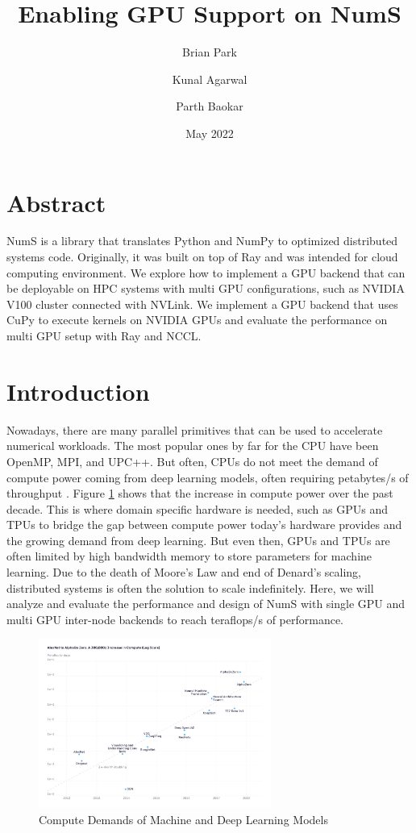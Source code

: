 \documentclass{article}
\title{Enabling GPU Support on NumS}
\author{Brian Park}
\author{Kunal Agarwal}
\author{Parth Baokar}
\affil{UC Berkeley, Computer Science 267}
\date{May 2022}
\begin{document}
\maketitle

\section*{Abstract}
NumS is a library that translates Python and NumPy to optimized distributed systems code. Originally, it was built on top of Ray and was intended for cloud computing environment. We explore how to implement a GPU backend that can be deployable on HPC systems with multi GPU configurations, such as NVIDIA V100 cluster connected with NVLink. We implement a GPU backend that uses CuPy to execute kernels on NVIDIA GPUs and evaluate the performance on multi GPU setup with Ray and NCCL.

\section{Introduction}
Nowadays, there are many parallel primitives that can be used to accelerate numerical workloads. The most popular ones by far for the CPU have been OpenMP, MPI, and UPC++. But often, CPUs do not meet the demand of compute power coming from deep learning models, often requiring petabytes/s of throughput \cite{openai}. Figure \ref{fig:openai} shows that the increase in compute power over the past decade. This is where domain specific hardware is needed, such as GPUs and TPUs to bridge the gap between compute power today's hardware provides and the growing demand from deep learning. But even then, GPUs and TPUs are often limited by high bandwidth memory to store parameters for machine learning. Due to the death of Moore's Law and end of Denard's scaling, distributed systems is often the solution to scale indefinitely. Here, we will analyze and evaluate the performance and design of NumS with single GPU and multi GPU inter-node backends to reach teraflops/s of performance.

\begin{figure}
  \centerline{\includegraphics[width=3in]{figures/ai-and-compute-modern-log.png}}
  \caption{Compute Demands of Machine and Deep Learning Models}
  \label{fig:openai}
\end{figure}
\end{document}
